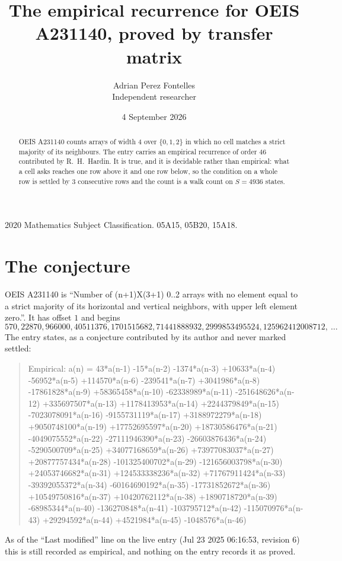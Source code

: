 \documentclass[11pt,a4paper]{article}
\title{The empirical recurrence for OEIS A231140, proved by transfer matrix}
\author{Adrian Perez Fontelles\\ \small Independent researcher}
\date{4 September 2026}
\theoremstyle{plain}
\theoremstyle{definition}
\begin{document}
\maketitle

\begin{abstract}
OEIS A231140 counts arrays of width $4$ over $\{0,1,2\}$ in which no cell matches a strict majority of its neighbours. The entry carries an
empirical recurrence of order $46$ contributed by R.~H.~Hardin. It is true, and it is
decidable rather than empirical: what a cell asks reaches one row above
it and one row below, so the condition on a whole row is settled by
$3$ consecutive rows and the count is a walk count on $S=4936$ states.
\end{abstract}

\noindent\small 2020 Mathematics Subject Classification. 05A15, 05B20, 15A18.\normalsize

\section{The conjecture}

OEIS A231140 is ``Number of (n+1)X(3+1) 0..2 arrays with no element equal to a strict majority of its horizontal and vertical neighbors, with upper left element zero.''. It has offset $1$ and begins
\[
570, 22870, 966000, 40511376, 1701515682, 71441888932, 2999853495524, 125962412008712,\ \dots
\]
The entry states, as a conjecture contributed by its author and never marked settled:
\begin{quote}
Empirical: a(n) = 43*a(n-1) -15*a(n-2) -1374*a(n-3) +10633*a(n-4) -56952*a(n-5) +114570*a(n-6) -239541*a(n-7) +3041986*a(n-8) -17861828*a(n-9) +58365458*a(n-10) -62338989*a(n-11) -251648626*a(n-12) +335697507*a(n-13) +1178413953*a(n-14) +2244379849*a(n-15) -7023078091*a(n-16) -9155731119*a(n-17) +3188972279*a(n-18) +9050748100*a(n-19) +17752695597*a(n-20) +18730586476*a(n-21) -4049075552*a(n-22) -27111946390*a(n-23) -26603876436*a(n-24) -5290500709*a(n-25) +34077168659*a(n-26) +73977083037*a(n-27) +20877757434*a(n-28) -101325400702*a(n-29) -121656003798*a(n-30) +24053746682*a(n-31) +124533338236*a(n-32) +71767911424*a(n-33) -39392055372*a(n-34) -60164690192*a(n-35) -17731852672*a(n-36) +10549750816*a(n-37) +10420762112*a(n-38) +1890718720*a(n-39) -68985344*a(n-40) -136270848*a(n-41) -103795712*a(n-42) -115070976*a(n-43) +29294592*a(n-44) +4521984*a(n-45) -1048576*a(n-46)
\end{quote}
As of the ``Last modified'' line on the live entry (Jul 23 2025 06:16:53, revision 6) this is still
recorded as empirical, and nothing on the entry records it as proved.
\end{document}
